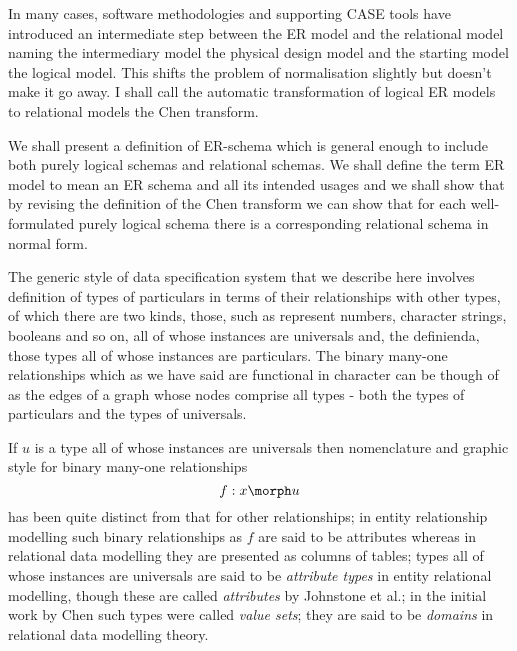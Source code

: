 In many cases, software methodologies and supporting CASE tools have introduced an intermediate step between the ER model and the relational model naming the intermediary model the physical design model and the starting model the logical
model. This shifts the problem of normalisation slightly but doesn't make it go away. I shall call the automatic transformation of logical ER models to relational models the Chen transform.  

We shall present a  definition of ER-schema which is general enough to include both purely logical schemas  and relational  schemas. We shall define the term ER model to mean an ER schema and all its intended usages and we shall show that by revising the definition of the Chen transform we can show that for each well-formulated purely logical schema there is a corresponding relational schema in normal form. 


The generic style of data specification system
that we describe here involves definition of types of particulars in terms of their relationships with other types,
of which there are two kinds, those, such as represent numbers, character strings, booleans and so on, all of
whose instances are universals and, the definienda, those types all of whose instances are particulars. The binary many-one relationships which as we have said are functional in character can be though of as the edges of a graph whose nodes comprise all types - both the types of particulars and the types of universals. 


If $u$ is a type all of whose instances are universals then 
nomenclature and graphic style for
binary many-one relationships
$$
f: x \morph u
$$
 has been quite distinct from that for other relationships;
in entity relationship modelling such binary relationships as $f$
are said to be attributes whereas in relational data modelling they are presented as columns of tables; types all of whose instances are universals  are said to be \textit{attribute types} in entity relational 
modelling, though  these are called \textit{attributes} by Johnstone et al.; in the initial work by  Chen such types were called \textit{value sets}; they are said to be \textit{domains} in relational data modelling theory. 

